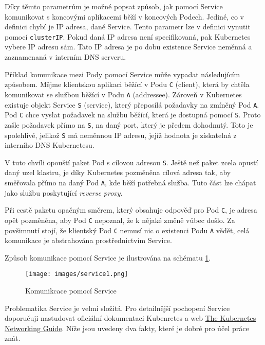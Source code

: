 Díky těmto parametrům je možné popsat způsob, jak pomocí Service komunikovat s koncovými aplikacemi běží v koncových Podech. Jediné, co v definici chybí je IP adresa, dané Service. Tento parametr lze v definici vynutit pomocí \verb|clusterIP|. Pokud daná IP adresa není specifikovaná, pak Kubernetes vybere IP adresu sám. Tato IP adresa je po dobu existence Service neměnná a zaznamenaná v interním DNS serveru. \cite{nassimkebbani_2022_the}

\bigskip

Příklad komunikace mezi Pody pomocí Service může vypadat následujícím způsobem. Mějme klientskou aplikaci běžící v Podu \verb|C| (client), která by chtěla komunikovat se službou běžící v Podu \verb|A| (addressee). Zároveň v Kubernetes existuje objekt Service \verb|S| (service), který přeposílá požadavky na zmíněný Pod \verb|A|. Pod \verb|C| chce vyslat požadavek na službu běžící, která je dostupná pomocí \verb|S|. Proto zašle požadavek přímo na \verb|S|, na daný port, který je předem dohodnutý. Toto je spolehlivé, jelikož \verb|S| má neměnnou IP adresu, jejíž hodnota je získatelná z interního DNS Kubernetesu.

V tuto chvíli opouští paket Pod s cílovou adresou \verb|S|. Ještě než paket zcela opustí daný uzel klastru, je díky Kubernetes pozměněna cílová adresa tak, aby směřovala přímo na daný Pod \verb|A|, kde běží potřebná služba. Tuto část lze chápat jako službu poskytující \textit{reverse proxy}.

Při cestě paketu opačným směrem, který obsahuje odpověď pro Pod \verb|C|, je adresa opět pozměněna, aby Pod \verb|C| nepoznal, že k nějaké změně vůbec došlo. Za povšimnutí stojí, že klientský Pod \verb|C| nemusí nic o existenci Podu \verb|A| vědět, celá komunikace je abstrahována prostřednictvím Service.

Způsob komunikace pomocí Service je ilustrována na schématu \ref{fig:service1}. 

\begin{figure}[!ht]
    \centering
    \texttt{[image: images/service1.png]}
    \caption[Komunikcace pomocí Service]{Komunikcace pomocí Service \cite{betz_2017_service}}
    \label{fig:service1}
\end{figure}

Problematika Service je velmi složitá. Pro detailnější pochopení Service doporučuji nastudovat oficiální dokumentaci Kubenretes a web \href{https://www.tkng.io/}{The Kubernetes Networking Guide}. Níže jsou uvedeny dva fakty, které je dobré pro účel práce znát.

